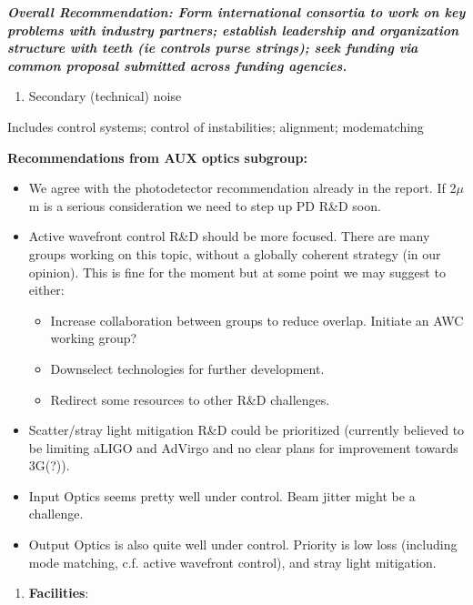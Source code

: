 \noindent \textbf{\textit{Overall Recommendation:  Form international consortia to work on key problems with industry partners; establish leadership and organization structure with teeth (ie controls purse strings); seek funding via common proposal submitted across funding agencies.}}

\noindent \textbf{\textit{}}

\begin{enumerate}
\item \textbf{\textit{ }} Secondary (technical) noise
\end{enumerate}

\noindent Includes control systems; control of instabilities; alignment; modematching

{\bf Recommendations from AUX optics subgroup:}
\begin{itemize}
\item We agree with the photodetector recommendation already in the report. If 2$\mu$m is a serious consideration we need to step up PD R\&D soon.
\item Active wavefront control R\&D should be more focused. There are many groups working on this topic, without a globally coherent strategy (in our opinion). This is fine for the moment but at some point we may suggest to either: \begin{itemize}
\item Increase collaboration between groups to reduce overlap. Initiate an AWC working group? 
\item Downselect technologies for further development. 
\item Redirect some resources to other R\&D challenges.
\end{itemize}
\item Scatter/stray light mitigation R\&D could be prioritized (currently believed to be limiting aLIGO and AdVirgo and no clear plans for improvement towards 3G(?)).
\item Input Optics seems pretty well under control. Beam jitter might be a challenge.
\item Output Optics is also quite well under control. Priority is low loss (including mode matching, c.f. active wavefront control), and stray light mitigation.
\end{itemize}

\noindent 

\noindent 

\noindent 

\noindent 

\begin{enumerate}
\item   \textbf{Facilities}: 
\end{enumerate}